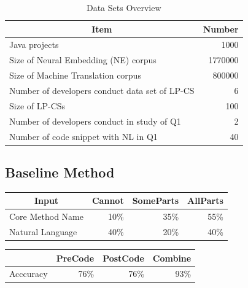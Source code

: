 \documentclass[sigconf,review,anonymous]{article}
\begin{document}
\begin{table}[]
\caption{Data Sets Overview}
\label{tbl:datasetOverview}
\centering
\begin{tabular}{|l|r|}
\hline
\multicolumn{1}{|c|}{\textbf{Item}}                & \multicolumn{1}{c|}{\textbf{Number}} \\ \hline
Java projects                                      & 1000                                 \\ \hline
Size of Neural Embedding (NE) corpus               & 1770000                              \\ \hline
Size of Machine Translation corpus                 & 800000                                                               \\ \hline
Number of developers conduct data set of LP-CS        & 6                                    \\ \hline
Size of LP-CSs & 100                                  \\ \hline
Number of developers conduct in study of Q1        & 2                                    \\ \hline
Number of code snippet with NL in Q1               & 40                                   \\ \hline
\end{tabular}
\end{table}
\subsection{Baseline Method}

\begin{table}[]
\centering
\begin{tabular}{|l|r|r|r|}
\hline
\multicolumn{1}{|c|}{\textbf{Input}} & \multicolumn{1}{l|}{\textbf{Cannot}} & \multicolumn{1}{l|}{\textbf{SomeParts}} & \multicolumn{1}{l|}{\textbf{AllParts}} \\ \hline
Core Method Name                     & 10\%                                 & 35\%                                    & 55\%                                   \\ \hline
Natural Language                     & 40\%                                 & 20\%                                    & 40\%                                   \\ \hline
\end{tabular}
\end{table}


\begin{table}[]
\centering
\begin{tabular}{|l|l|l|l|}
\hline
\textbf{} & \textbf{PreCode}          & \textbf{PostCode}         & \textbf{Combine}          \\ \hline
Acccuracy & \multicolumn{1}{r|}{76\%} & \multicolumn{1}{r|}{76\%} & \multicolumn{1}{r|}{93\%} \\ \hline
\end{tabular}
\end{table}
\end{document}

